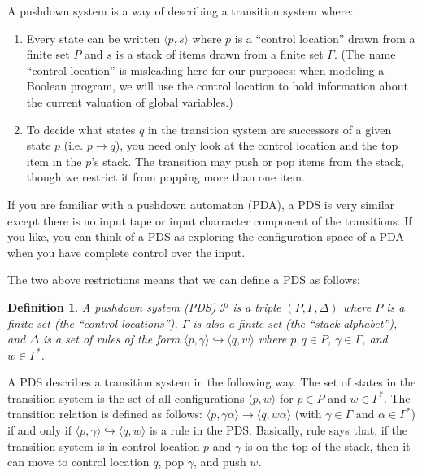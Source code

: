 \documentclass{article}
\newcommand{\Config}[2]{\ensuremath{\langle #1, #2 \rangle}}
\newcommand{\Rule}[2]{\ensuremath{#1 \hookrightarrow #2}}
\newtheorem{definition}{Definition}
\begin{document}
A pushdown system is a way of describing a transition system where:
\begin{enumerate}
\item Every state can be written \Config{p}{s} where $p$ is a
  ``control location'' drawn from a finite set $P$ and $s$ is a stack
  of items drawn from a finite set $\Gamma$. (The name ``control
  location'' is misleading here for our purposes: when modeling a
  Boolean program, we will use the control location to hold
  information about the current valuation of global variables.)
\item To decide what states $q$ in the transition system are
  successors of a given state $p$ (i.e. $p \rightarrow q$), you need
  only look at the control location and the top item in the $p$'s
  stack. The transition may push or pop items from the stack, though
  we restrict it from popping more than one item.
\end{enumerate}

If you are familiar with a pushdown automaton (PDA), a PDS is very
similar except there is no input tape or input charracter component of
the transitions. If you like, you can think of a PDS as exploring the
configuration space of a PDA when you have complete control over the
input.

The two above restrictions means that we can define a PDS as follows:

\begin{definition}
  A pushdown system (PDS) $\mathcal{P}$ is a triple $(P, \Gamma,
  \Delta)$ where $P$ is a finite set (the ``control locations''),
  $\Gamma$ is also a finite set (the ``stack alphabet''), and $\Delta$
  is a set of rules of the form
  \Rule{\Config{p}{\gamma}}{\Config{q}{w}} where $p, q \in P$, $\gamma
  \in \Gamma$, and $w \in \Gamma^*$.
\end{definition}

A PDS describes a transition system in the following way. The set of
states in the transition system is the set of all configurations
\Config{p}{w} for $p \in P$ and $w \in \Gamma^*$. The transition
relation is defined as follows: $\Config{p}{\gamma\alpha} \rightarrow
\Config{q}{w\alpha}$ (with $\gamma \in \Gamma$ and $\alpha \in
\Gamma^*$) if and only if $\Rule{\Config{p}{\gamma}}{\Config{q}{w}}$
is a rule in the PDS. Basically, rule says that, if the transition
system is in control location $p$ and $\gamma$ is on the top of the
stack, then it can move to control location $q$, pop $\gamma$, and
push $w$.
\end{document}
